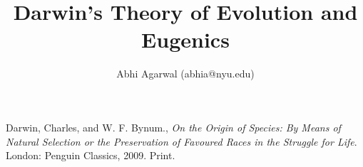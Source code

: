 \documentclass[11pt, oneside]{article}
\title{Darwin's Theory of Evolution and Eugenics}
\author{Abhi Agarwal (abhia@nyu.edu)}
\date{}
\begin{document}
\maketitle

\par 

\begin{thebibliography}{9}
  Darwin, Charles, and W. F. Bynum.,
  \emph{On the Origin of Species: By Means of Natural Selection or the Preservation of Favoured Races in the Struggle for Life}.
  London: Penguin Classics, 2009.
  Print.
\end{thebibliography}
\end{document}
